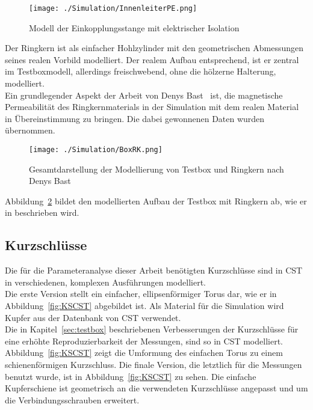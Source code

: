             \begin{figure}[htb]
                \centering
                \texttt{[image: ./Simulation/InnenleiterPE.png]}
                \caption{Modell der Einkopplungsstange mit elektrischer Isolation}
                \label{fig:InnenleiterCST}
            \end{figure}
        
        Der Ringkern ist als einfacher Hohlzylinder mit den geometrischen Abmessungen seines realen Vorbild modelliert. Der realem Aufbau entsprechend, ist er zentral im Testboxmodell, allerdings freischwebend, ohne die hölzerne Halterung, modelliert.\\
        Ein grundlegender Aspekt der Arbeit von Denys Bast~\citep{bast2017ba} ist, die magnetische Permeabilität des Ringkernmaterials in der Simulation mit dem realen Material in Übereinstimmung zu bringen. Die dabei gewonnenen Daten wurden übernommen.
        
            \begin{figure}[htb]
                \centering
                \texttt{[image: ./Simulation/BoxRK.png]}
                \caption{Gesamtdarstellung der Modellierung von Testbox und Ringkern nach Denys Bast~\citep{bast2017ba}}
                \label{fig:BoxRKCST}
            \end{figure}
        
        Abbildung~\ref{fig:BoxRKCST} bildet den modellierten Aufbau der Testbox mit Ringkern ab, wie er in \citep{bast2017ba} beschrieben wird.

        \subsection{Kurzschlüsse}
        Die für die Parameteranalyse dieser Arbeit benötigten Kurzschlüsse sind in CST in verschiedenen, komplexen Ausführungen modelliert.\\
        Die erste Version stellt ein einfacher, ellipsenförmiger Torus dar, wie er in Abbildung~\ref{fig:KSCST} abgebildet ist. Als Material für die Simulation wird Kupfer aus der Datenbank von CST verwendet.\\
        Die in Kapitel~\ref{sec:testbox} beschriebenen Verbesserungen der Kurzschlüsse für eine erhöhte Reproduzierbarkeit der Messungen, sind so in CST modelliert. Abbildung~\ref{fig:KSCST} zeigt die Umformung des einfachen Torus zu einem schienenförmigen Kurzschluss. Die finale Version, die letztlich für die Messungen benutzt wurde, ist in Abbildung~\ref{fig:KSCST} zu sehen. Die einfache Kupferschiene ist geometrisch an die verwendeten Kurzschlüsse angepasst und um die Verbindungsschrauben erweitert.
        
